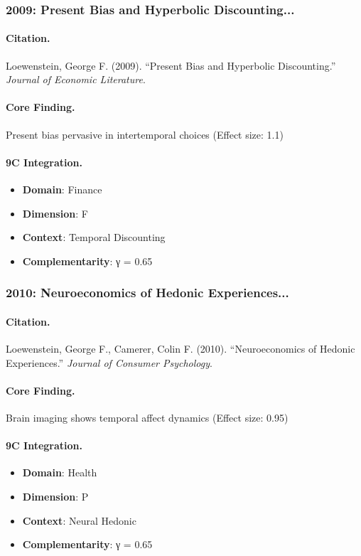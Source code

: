 \subsubsection{2009: Present Bias and Hyperbolic Discounting...}

\paragraph{Citation.}
Loewenstein, George F. (2009). ``Present Bias and Hyperbolic Discounting.''
\textit{Journal of Economic Literature}.

\paragraph{Core Finding.}
Present bias pervasive in intertemporal choices (Effect size: 1.1)

\paragraph{9C Integration.}
\begin{itemize}[nosep]
  \item \textbf{Domain}: Finance
  \item \textbf{Dimension}: F
  \item \textbf{Context}: Temporal Discounting
  \item \textbf{Complementarity}: γ = 0.65
\end{itemize}

\subsubsection{2010: Neuroeconomics of Hedonic Experiences...}

\paragraph{Citation.}
Loewenstein, George F., Camerer, Colin F. (2010). ``Neuroeconomics of Hedonic Experiences.''
\textit{Journal of Consumer Psychology}.

\paragraph{Core Finding.}
Brain imaging shows temporal affect dynamics (Effect size: 0.95)

\paragraph{9C Integration.}
\begin{itemize}[nosep]
  \item \textbf{Domain}: Health
  \item \textbf{Dimension}: P
  \item \textbf{Context}: Neural Hedonic
  \item \textbf{Complementarity}: γ = 0.65
\end{itemize}

